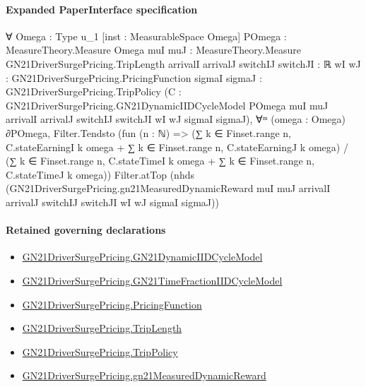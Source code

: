 \documentclass[10pt]{article}
\begin{document}
\paragraph{Expanded PaperInterface specification}
\begin{ReviewVerbatim}
∀ {Omega : Type u_1} [inst : MeasurableSpace Omega] {POmega : MeasureTheory.Measure Omega}
  {muI muJ : MeasureTheory.Measure GN21DriverSurgePricing.TripLength} {arrivalI arrivalJ switchIJ switchJI : ℝ}
  {wI wJ : GN21DriverSurgePricing.PricingFunction} {sigmaI sigmaJ : GN21DriverSurgePricing.TripPolicy}
  (C :
    GN21DriverSurgePricing.GN21DynamicIIDCycleModel POmega muI muJ arrivalI arrivalJ switchIJ switchJI wI wJ sigmaI
      sigmaJ),
  ∀ᵐ (omega : Omega) ∂POmega,
    Filter.Tendsto
      (fun (n : ℕ) =>
        (∑ k ∈ Finset.range n, C.stateEarningI k omega + ∑ k ∈ Finset.range n, C.stateEarningJ k omega) /
          (∑ k ∈ Finset.range n, C.stateTimeI k omega + ∑ k ∈ Finset.range n, C.stateTimeJ k omega))
      Filter.atTop
      (nhds
        (GN21DriverSurgePricing.gn21MeasuredDynamicReward muI muJ arrivalI arrivalJ switchIJ switchJI wI wJ sigmaI
          sigmaJ))
\end{ReviewVerbatim}

\paragraph{Retained governing declarations}
\begin{itemize}\raggedright
\item \hyperlink{paper-prerequisite-470400593141b2a3}{GN21\allowbreak{}Driver\allowbreak{}Surge\allowbreak{}Pricing.\allowbreak{}GN21\allowbreak{}Dynamic\allowbreak{}IID\allowbreak{}Cycle\allowbreak{}Model}
\item \hyperlink{paper-prerequisite-be12410503a9b0bd}{GN21\allowbreak{}Driver\allowbreak{}Surge\allowbreak{}Pricing.\allowbreak{}GN21\allowbreak{}Time\allowbreak{}Fraction\allowbreak{}IID\allowbreak{}Cycle\allowbreak{}Model}
\item \hyperlink{governing-declaration-9ab0ab344da5df05}{GN21\allowbreak{}Driver\allowbreak{}Surge\allowbreak{}Pricing.\allowbreak{}Pricing\allowbreak{}Function}
\item \hyperlink{governing-declaration-a616c143f22cf2bc}{GN21\allowbreak{}Driver\allowbreak{}Surge\allowbreak{}Pricing.\allowbreak{}Trip\allowbreak{}Length}
\item \hyperlink{governing-declaration-4312ad4cb899871f}{GN21\allowbreak{}Driver\allowbreak{}Surge\allowbreak{}Pricing.\allowbreak{}Trip\allowbreak{}Policy}
\item \hyperlink{governing-declaration-e92066386ccc29f4}{GN21\allowbreak{}Driver\allowbreak{}Surge\allowbreak{}Pricing.\allowbreak{}gn21\allowbreak{}Measured\allowbreak{}Dynamic\allowbreak{}Reward}
\end{itemize}
\end{document}
